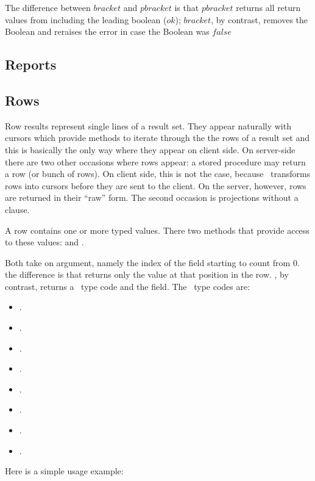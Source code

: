 The difference between $bracket$ and $pbracket$ is
that $pbracket$ returns all return values from 
including the leading boolean ($ok$);
$bracket$, by contrast, removes the Boolean
and reraises the error in case the Boolean was $false$

\subsection{Reports}

\subsection{Rows}
Row results represent single lines of a result set.
They appear naturally with cursors which provide
methods to iterate through the the rows of a result set
and this is basically the only way where they
appear on client side. On server-side there are two
other occasions where rows appear:
a stored procedure may return a row (or bunch of rows).
On client side, this is not the case, because \nowdb\
transforms rows into cursors before they are sent to
the client. On the server, however, rows are returned in
their ``raw'' form.
The second occasion is projections
without a  clause.

A row contains one or more typed values.
There two methods that provide access to these values:
 and .

Both take on argument, namely the index of the field
starting to count from 0. the difference is that
 returns only the value at that position
in the row. , by contrast,
returns a \nowdb\ type code and the field.
The \nowdb\ type codes are:

\begin{itemize}
\item {}.
\item {}.
\item {}.
\item {}.
\item {}.
\item {}.
\item {}.
\item \term{nowdb}.
\end{itemize}

Here is a simple usage example:

